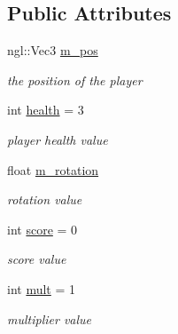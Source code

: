 \subsection*{Public Attributes}
\begin{DoxyCompactItemize}
\item 
\hypertarget{class_player_abe61d516fab1c2baec12586e93907811}{ngl\-::\-Vec3 \hyperlink{class_player_abe61d516fab1c2baec12586e93907811}{m\-\_\-pos}}\label{class_player_abe61d516fab1c2baec12586e93907811}

\begin{DoxyCompactList}\small\item\em the position of the player \end{DoxyCompactList}\item 
\hypertarget{class_player_aad33b52bfe73c4c978a3135172f286a0}{int \hyperlink{class_player_aad33b52bfe73c4c978a3135172f286a0}{health} = 3}\label{class_player_aad33b52bfe73c4c978a3135172f286a0}

\begin{DoxyCompactList}\small\item\em player health value \end{DoxyCompactList}\item 
\hypertarget{class_player_acd5f8e9953ff8d643954f425e2a0b197}{float \hyperlink{class_player_acd5f8e9953ff8d643954f425e2a0b197}{m\-\_\-rotation}}\label{class_player_acd5f8e9953ff8d643954f425e2a0b197}

\begin{DoxyCompactList}\small\item\em rotation value \end{DoxyCompactList}\item 
\hypertarget{class_player_ace6abae8d66534ad0a1fd6458f786a6e}{int \hyperlink{class_player_ace6abae8d66534ad0a1fd6458f786a6e}{score} = 0}\label{class_player_ace6abae8d66534ad0a1fd6458f786a6e}

\begin{DoxyCompactList}\small\item\em score value \end{DoxyCompactList}\item 
\hypertarget{class_player_a102fffbd6250cb9c776d2b8ff98b51ca}{int \hyperlink{class_player_a102fffbd6250cb9c776d2b8ff98b51ca}{mult} = 1}\label{class_player_a102fffbd6250cb9c776d2b8ff98b51ca}

\begin{DoxyCompactList}\small\item\em multiplier value \end{DoxyCompactList}\end{DoxyCompactItemize}


